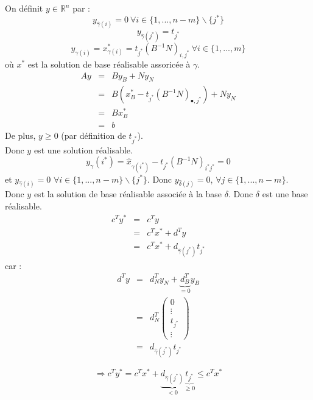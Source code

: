 \begin{dem}
On définit $y\in\mathbb{R}^n$ par :
	\[y_{\hat{\gamma}(i)}=0\ \forall i\in\{1,...,n-m\}\backslash\{j^*\}\]
	\[y_{\hat{\gamma}(j^*)}=t_{j^*}\]
	\[y_{\gamma(i)}=x^*_{\gamma(i)}=t_{j^*}(B^{-1}N)_{i,j^*}\ \forall i\in\{1,...,m\}\]
où $x^*$ est la solution de base réalisable assoricée à $\gamma$.
\begin{eqnarray*}
	Ay&=&By_B+Ny_N\\
	  &=&B(x^*_B-t_{j^*}(B^{-1}N)_{\bullet,j^*})+Ny_N\\
	  &=&Bx_B^*\\
	  &=&b
\end{eqnarray*}
De plus, $y\geq 0$ (par définition de $t_{j^*}$).\\
Donc $y$ est une solution réalisable.
	\[y_{\gamma}(i^*)=\hat{x}_{\gamma(i^*)}-t_{j^*}(B^{-1}N)_{i^*j^*}=0\]
et $y_{\hat{\gamma}(i)}=0$ $\forall i\in\{1,...,n-m\}\backslash\{j^*\}$. Donc $y_{\hat{\delta}(j)}=0$, $\forall j\in\{1,...,n-m\}$.\\
Donc $y$ est la solution de base réalisable associée à la base $\delta$. Donc $\delta$ est une base réalisable.
\begin{eqnarray*}
	c^Ty^*&=&c^Ty\\
		&=&c^Tx^*+d^Ty\\
		&=&c^Tx^*+d_{\hat{\gamma}(j^*)}t_{j^*}
\end{eqnarray*}
car :
\begin{eqnarray*}
	d^Ty&=&d^T_Ny_N+\underbrace{d^T_B}_{=0}y_B\\
	    &=&d^T_N \begin{pmatrix} 0 \\ \vdots \\ t_{j^*} \\ \vdots \end{pmatrix} \\
	    &=& d_{\hat{\gamma}(j^*)}t_{j^*}
\end{eqnarray*}

\[\Rightarrow c^Ty^*=c^Tx^*+\underbrace{d_{\hat{\gamma}(j^*)}}_{<0}\underbrace{t_{j^*}}_{\geq 0}\leq c^Tx^*\]
\end{dem}


